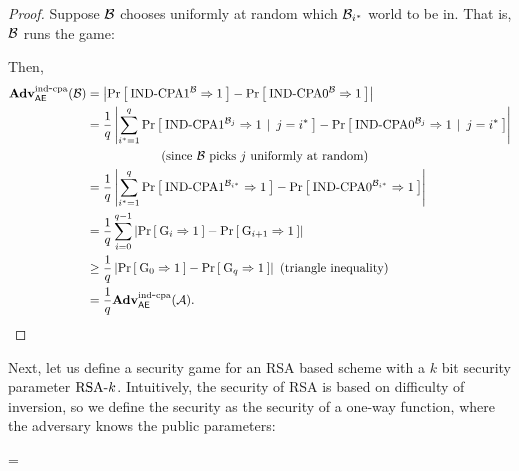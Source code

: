 \begin{proof}
Suppose ${\mathcal B}$ chooses uniformly at random which ${\mathcal B}_{i^*}$ world to be in. That is, ${\mathcal B}$ runs the game:
\begin{center}
\end{center}
Then,
\begin{align*}
  \AdvINDCPA{\AEnc}{\advB}
    &= \left| \Prob{\INDCPA1^\advB\Rightarrow1} - \Prob{\INDCPA0^\advB\Rightarrow1} \right|\\
    &= \frac{1}{q} \left|
    \sum_{i^*=1}^q\CondProb{\INDCPA1^{\advB_j}\Rightarrow1}{j= i^*} -
    \CondProb{\INDCPA0^{\advB_j}\Rightarrow1}{j=i^*} \right| \\
    & \text{\hspace{2cm} (since $\advB$ picks $j$ uniformly at random)}\\
    &= \frac{1}{q} \left|
    \sum_{i^*=1}^q\Prob{\INDCPA1^{\advB_{i^*}}\Rightarrow1} - \Prob{\INDCPA0^{\advB_{i^*}}\Rightarrow1} \right|\\
%  
%
  &= \frac{1}{q}\sum_{i=0}^{q-1} \left|\Prob{\G_i\Rightarrow1} - \Prob{\G_{i+1}\Rightarrow1}\right|\\
  &\geq \frac{1}{q}\left|\Prob{\G_0\Rightarrow1} - \Prob{\G_q\Rightarrow1}\right| \, \, \text{(triangle inequality)} \\
  &= \frac{1}{q} \AdvINDCPA{\AEnc}{\advA}.
\end{align*}
\end{proof}

Next, let us define a security game for an RSA based scheme with a $k$ bit security parameter $\textnormal{RSA}\mbox{-} k$. Intuitively, the security of RSA is based on difficulty of inversion, so we define the security as the security of a one-way function, where the adversary knows the public parameters:
\begin{center}
\end{center}
\bnm
  \AdvOWFRSA{\RSAk}{\advA} = \Prob{\OWF_{\RSAk}^\advA\Rightarrow\true}
\enm

